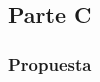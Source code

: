 \documentclass[../procedimientos.tex]{subfiles}
\begin{document}
\clearpage
\subsection{Parte C}
\subsubsection{Propuesta}
\end{document}
